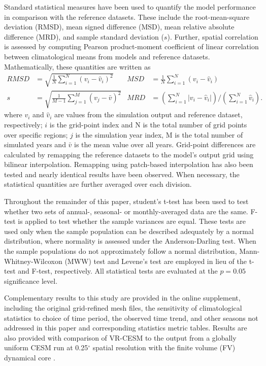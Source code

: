 \documentclass[ms]{agutex}   %
\begin{document}
\begin{article}
Standard statistical measures have been used to quantify the model performance in comparison with the reference datasets. These include the root-mean-square deviation (RMSD), mean signed difference (MSD), mean relative absolute difference (MRD), and sample standard deviation ($s$). Further, spatial correlation is assessed by computing Pearson product-moment coefficient of linear correlation between climatological means from models and reference datasets.  Mathematically, these quantities are written as
\begin{align}
RMSD &= \sqrt{\frac{1}{N} \sum_{i=1}^{N} (v_i - \hat{v}_i)^2}  & MSD &= \frac{1}{N} \sum_{i=1}^{N} (v_i - \hat{v}_i) \\[2.0ex]
s &= \sqrt{\frac{1}{M-1} \sum_{j=1}^{M} (v_j - \bar{v})^2}   & MRD &= \left( \sum_{i=1}^{N} |v_i - \hat{v}_i| \right) \Bigg/ \left( \sum_{i=1}^{N} \hat{v}_i \right).
\end{align} where $v_i$ and $\hat{v}_i$ are values from the simulation output and reference dataset, respectively; $i$ is the grid-point index and N is the total number of grid points over specific regions; $j$ is the simulation year index, M is the total number of simulated years and $\bar{v}$ is the mean value over all years. Grid-point differences are calculated by remapping the reference datasets to the model's output grid using bilinear interpolation.  Remapping using patch-based interpolation has also been tested and nearly identical results have been observed.  When necessary, the statistical quantities are further averaged over each division.


Throughout the remainder of this paper, student's t-test has been used to test whether two sets of annual-, seasonal- or monthly-averaged data are the same. F-test is applied to test whether the sample variances are equal. These tests are used only when the sample population can be described adequately by a normal distribution, where normality is assessed under the Anderson-Darling test. When the sample populations do not approximately follow a normal distribution, Mann-Whitney-Wilcoxon (MWW) test and Levene's test are employed in lieu of the t-test and F-test, respectively. All statistical tests are evaluated at the $p = 0.05$ significance level.

Complementary results to this study are provided in the online supplement, including the original grid-refined mesh files, the sensitivity of climatological statistics to choice of time period, the observed time trend, and other seasons not addressed in this paper and corresponding statistics metric tables. Results are also provided with comparison of VR-CESM to the output from a globally uniform CESM run at 0.25$^\circ$ spatial resolution with the finite volume (FV) dynamical core \citep{wehner2014effect}.


\end{article}
\end{document}
